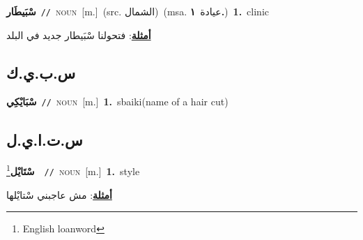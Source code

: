 \documentclass[10pt,a4paper,twoside]{article} %
\begin{document}
\begin{multicols}{2}
{\setlength\topsep{0pt}\textbf{\foreignlanguage{arabic}{سْبَيطَار}}\ {\color{gray}\texttt{//}\color{black}}\ \textsc{noun}\ [m.]\ (src. \color{gray}\foreignlanguage{arabic}{الشمال}\color{black})\ \color{gray}(msa. \foreignlanguage{arabic}{عيادة}~\foreignlanguage{arabic}{\textbf{١.}})\color{black}\ \textbf{1.}~clinic\  \begin{flushright}\color{gray}\foreignlanguage{arabic}{\textbf{\underline{\foreignlanguage{arabic}{أمثلة}}}: فتحولنا سْبَيطار جديد في البلد}\end{flushright}\color{black}} \vspace{2mm}

\vspace{-3mm}
\subsection*{\color{blue}\foreignlanguage{arabic}{س.ب.ي.ك}\color{blue}{ (ntws)}} 

{\setlength\topsep{0pt}\textbf{\foreignlanguage{arabic}{سْبَايْكِي}}\ {\color{gray}\texttt{//}\color{black}}\ \textsc{noun}\ [m.]\ \textbf{1.}~sbaiki(name of a hair cut)\ } \vspace{2mm}

\vspace{-3mm}
\subsection*{\color{blue}\foreignlanguage{arabic}{س.ت.ا.ي.ل}\color{blue}{ (ntws)}} 

{\setlength\topsep{0pt}\textbf{\foreignlanguage{arabic}{سْتَايْل}}\footnote{English loanword}\ \ {\color{gray}\texttt{//}\color{black}}\ \textsc{noun}\ [m.]\ \textbf{1.}~style\  \begin{flushright}\color{gray}\foreignlanguage{arabic}{\textbf{\underline{\foreignlanguage{arabic}{أمثلة}}}: مش عاجبني سْتايْلها}\end{flushright}\color{black}} \vspace{2mm}


\end{multicols}
\end{document}
